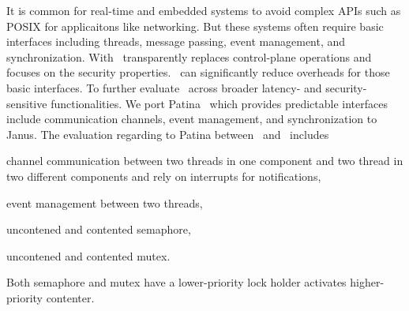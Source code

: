 It is common for real-time and embedded systems to avoid complex APIs such as POSIX for applicaitons like networking.
But these systems often require basic interfaces including threads, message passing, event management, and synchronization.
With \name\ transparently replaces control-plane operations and focuses on the security properties.
\name\ can significantly reduce overheads for those basic interfaces.
To further evaluate \name\ across broader latency- and security-sensitive functionalities.
We port Patina~\cite{patina} which provides predictable interfaces include communication channels, event management, and synchronization to Janus.
The evaluation regarding to Patina between \name\ and \cos\ includes
\begin{inparaenum}[(1)]
\item channel communication between two threads in one component and two thread in two different components and rely on interrupts for notifications,
\item event management between two threads,
\item uncontened and contented semaphore,
\item uncontened and contented mutex.
\end{inparaenum}
Both semaphore and mutex have a lower-priority lock holder activates higher-priority contenter.


